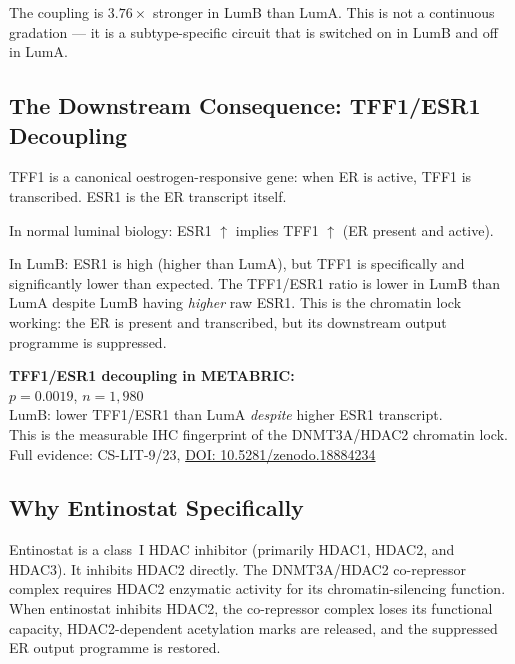 \documentclass[12pt, a4paper]{article}
\begin{document}
\vspace{0.5em}

The coupling is $3.76\times$ stronger in LumB
than LumA. This is not a continuous gradation ---
it is a subtype-specific circuit that is switched
on in LumB and off in LumA.

\subsection{The Downstream Consequence:
TFF1/ESR1 Decoupling}

TFF1 is a canonical oestrogen-responsive gene:
when ER is active, TFF1 is transcribed. ESR1 is
the ER transcript itself.

In normal luminal biology: ESR1 $\uparrow$ implies
TFF1 $\uparrow$ (ER present and active).

In LumB: ESR1 is high (higher than LumA), but
TFF1 is specifically and significantly lower than
expected. The TFF1/ESR1 ratio is lower in LumB
than LumA despite LumB having \textit{higher}
raw ESR1. This is the chromatin lock working:
the ER is present and transcribed, but its
downstream output programme is suppressed.

\begin{center}
\colorbox{findingbox}{
\begin{minipage}{0.88\textwidth}
\vspace{0.5em}
\textbf{TFF1/ESR1 decoupling in METABRIC:}\\[0.3em]
$p=0.0019$, $n=1{,}980$\\[0.2em]
LumB: lower TFF1/ESR1 than LumA
\textit{despite} higher ESR1 transcript.\\[0.2em]
This is the measurable IHC fingerprint of the
DNMT3A/HDAC2 chromatin lock.\\[0.2em]
Full evidence: CS-LIT-9/23,
\href{https://doi.org/10.5281/zenodo.18884234}
{DOI: 10.5281/zenodo.18884234}
\vspace{0.5em}
\end{minipage}}
\end{center}

\subsection{Why Entinostat Specifically}

Entinostat is a class~I HDAC inhibitor (primarily
HDAC1, HDAC2, and HDAC3). It inhibits HDAC2
directly. The DNMT3A/HDAC2 co-repressor complex
requires HDAC2 enzymatic activity for its
chromatin-silencing function. When entinostat
inhibits HDAC2, the co-repressor complex loses
its functional capacity, HDAC2-dependent
acetylation marks are released, and the suppressed
ER output programme is restored.
\end{document}
